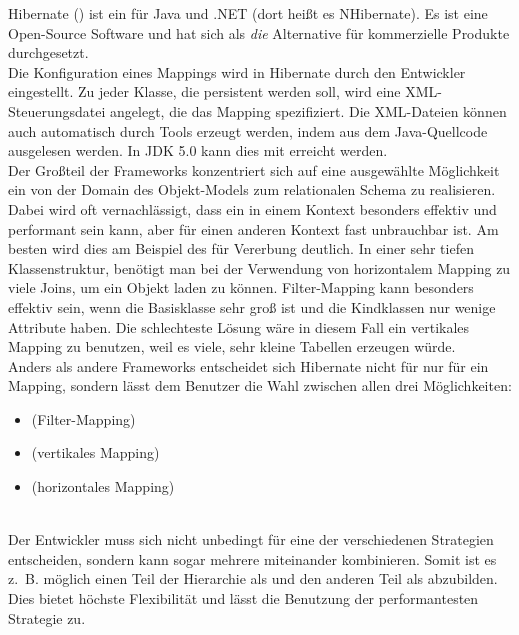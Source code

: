 Hibernate (\cite{Hibernate}) ist ein  für Java und .NET (dort heißt es NHibernate). Es ist eine Open-Source Software und hat sich als \textit{die} Alternative für kommerzielle Produkte durchgesetzt.\\
Die Konfiguration eines Mappings wird in Hibernate durch den Entwickler eingestellt. Zu jeder Klasse, die persistent werden soll, wird eine XML-Steuerungsdatei angelegt, die das Mapping spezifiziert. Die XML-Dateien können auch automatisch durch Tools erzeugt werden, indem  aus dem Java-Quellcode ausgelesen werden. In JDK 5.0 kann dies mit  erreicht werden.\\
Der Großteil der Frameworks konzentriert sich auf eine ausgewählte Möglichkeit ein  von der Domain des Objekt-Models zum relationalen Schema zu realisieren. Dabei wird oft vernachlässigt, dass ein  in einem Kontext besonders effektiv und performant sein kann, aber für einen anderen Kontext fast unbrauchbar ist. Am besten wird dies am Beispiel des  für Vererbung deutlich. In einer sehr tiefen Klassenstruktur, benötigt man bei der Verwendung von horizontalem Mapping zu viele Joins, um ein Objekt laden zu können. Filter-Mapping kann besonders effektiv sein, wenn die Basisklasse sehr groß ist und die Kindklassen nur wenige Attribute haben. Die schlechteste Lösung wäre in diesem Fall ein vertikales Mapping zu benutzen, weil es viele, sehr kleine Tabellen erzeugen würde.\\
Anders als andere Frameworks entscheidet sich Hibernate nicht für nur für ein Mapping, sondern lässt dem Benutzer die Wahl zwischen allen drei Möglichkeiten:
\begin{itemize}
\item {} (Filter-Mapping)
\item {} (vertikales Mapping)
\item {} (horizontales Mapping)
\end{itemize}
\cite[Kapitel: Inheritance]{hibernate-documentation}\\
Der Entwickler muss sich nicht unbedingt für eine der verschiedenen Strategien entscheiden, sondern kann sogar mehrere miteinander kombinieren. Somit ist es z.~B. möglich einen Teil der Hierarchie als  und den anderen Teil als  abzubilden. Dies bietet höchste Flexibilität und lässt die Benutzung der performantesten Strategie zu.\\


